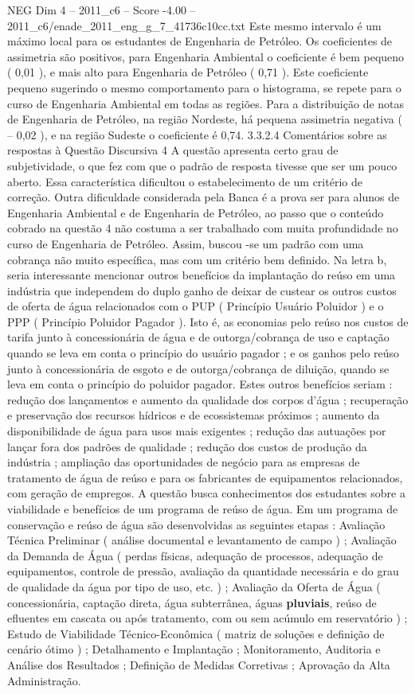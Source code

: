 \begin{textsample}{NEG Dim 4 – 2011\_c6 – Score -4.00 – 2011\_c6/enade\_2011\_eng\_g\_7\_41736c10cc.txt}
Este mesmo intervalo é um máximo local para os estudantes de Engenharia de Petróleo.
Os coeficientes de assimetria são positivos, para Engenharia Ambiental o coeficiente é bem pequeno ( 0,01 ), e mais alto para Engenharia de Petróleo ( 0,71 ).
Este coeficiente pequeno sugerindo o mesmo comportamento para o histograma, se repete para o curso de Engenharia Ambiental em todas as regiões.
Para a distribuição de notas de Engenharia de Petróleo, na região Nordeste, há pequena assimetria negativa ( – 0,02 ), e na região Sudeste o coeficiente é 0,74. 3.3.2.4 Comentários sobre as respostas à Questão Discursiva 4 A questão apresenta certo grau de subjetividade, o que fez com que o padrão de resposta tivesse que ser um pouco aberto.
Essa característica dificultou o estabelecimento de um critério de correção.
Outra dificuldade considerada pela Banca é a prova ser para alunos de Engenharia Ambiental e de Engenharia de Petróleo, ao passo que o conteúdo cobrado na questão 4 não costuma a ser trabalhado com muita profundidade no curso de Engenharia de Petróleo.
Assim, buscou -se um padrão com uma cobrança não muito específica, mas com um critério bem definido.
Na letra b, seria interessante mencionar outros benefícios da implantação do reúso em uma indústria que independem do duplo ganho de deixar de custear os outros custos de oferta de água relacionados com o PUP ( Princípio Usuário Poluidor ) e o PPP ( Princípio Poluidor Pagador ).
Isto é, as economias pelo reúso nos custos de tarifa junto à concessionária de água e de outorga/cobrança de uso e captação quando se leva em conta o princípio do usuário pagador ; e os ganhos pelo reúso junto à concessionária de esgoto e de outorga/cobrança de diluição, quando se leva em conta o princípio do poluidor pagador.
Estes outros benefícios seriam : redução dos lançamentos e aumento da qualidade dos corpos d’água ; recuperação e preservação dos recursos hídricos e de ecossistemas próximos ; aumento da disponibilidade de água para usos mais exigentes ; redução das autuações por lançar fora dos padrões de qualidade ; redução dos custos de produção da indústria ; ampliação das oportunidades de negócio para as empresas de tratamento de água de reúso e para os fabricantes de equipamentos relacionados, com geração de empregos.
A questão busca conhecimentos dos estudantes sobre a viabilidade e benefícios de um programa de reúso de água.
Em um programa de conservação e reúso de água são desenvolvidas as seguintes etapas : Avaliação Técnica Preliminar ( análise documental e levantamento de campo ) ; Avaliação da Demanda de Água ( perdas físicas, adequação de processos, adequação de equipamentos, controle de pressão, avaliação da quantidade necessária e do grau de qualidade da água por tipo de uso, etc. ) ; Avaliação da Oferta de Água ( concessionária, captação direta, água subterrânea, águas \textbf{pluviais}, reúso de efluentes em cascata ou após tratamento, com ou sem acúmulo em reservatório ) ; Estudo de Viabilidade Técnico-Econômica ( matriz de soluções e definição de cenário ótimo ) ; Detalhamento e Implantação ; Monitoramento, Auditoria e Análise dos Resultados ; Definição de Medidas Corretivas ; Aprovação da Alta Administração.

\end{textsample}
